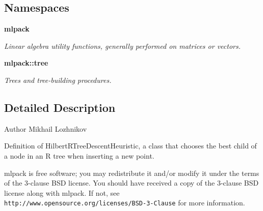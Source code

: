 \subsection*{Namespaces}
\begin{DoxyCompactItemize}
\item 
 {\bf mlpack}
\begin{DoxyCompactList}\small\item\em Linear algebra utility functions, generally performed on matrices or vectors. \end{DoxyCompactList}\item 
 {\bf mlpack\+::tree}
\begin{DoxyCompactList}\small\item\em Trees and tree-\/building procedures. \end{DoxyCompactList}\end{DoxyCompactItemize}


\subsection{Detailed Description}
\begin{DoxyAuthor}{Author}
Mikhail Lozhnikov
\end{DoxyAuthor}
Definition of Hilbert\+R\+Tree\+Descent\+Heuristic, a class that chooses the best child of a node in an R tree when inserting a new point.

mlpack is free software; you may redistribute it and/or modify it under the terms of the 3-\/clause B\+SD license. You should have received a copy of the 3-\/clause B\+SD license along with mlpack. If not, see {\tt http\+://www.\+opensource.\+org/licenses/\+B\+S\+D-\/3-\/\+Clause} for more information. 